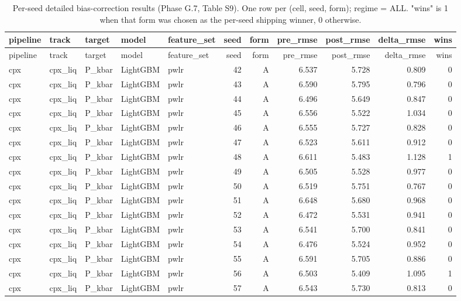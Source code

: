 \begin{longtable}{lllllrrrrrr}
\caption{Per-seed detailed bias-correction results (Phase G.7, Table S9). One row per (cell, seed, form); regime = ALL. "wins" is 1 when that form was chosen as the per-seed shipping winner, 0 otherwise.} \label{tab:bc_per_seed} \\
\toprule
pipeline & track & target & model & feature\_set & seed & form & pre\_rmse & post\_rmse & delta\_rmse & wins \\
\midrule
\endfirsthead
\toprule
pipeline & track & target & model & feature\_set & seed & form & pre\_rmse & post\_rmse & delta\_rmse & wins \\
\midrule
\endhead
\bottomrule
\endfoot
cpx & cpx\_liq & P\_kbar & LightGBM & pwlr & 42 & A & 6.537 & 5.728 & 0.809 & 0 \\
cpx & cpx\_liq & P\_kbar & LightGBM & pwlr & 43 & A & 6.590 & 5.795 & 0.796 & 0 \\
cpx & cpx\_liq & P\_kbar & LightGBM & pwlr & 44 & A & 6.496 & 5.649 & 0.847 & 0 \\
cpx & cpx\_liq & P\_kbar & LightGBM & pwlr & 45 & A & 6.556 & 5.522 & 1.034 & 0 \\
cpx & cpx\_liq & P\_kbar & LightGBM & pwlr & 46 & A & 6.555 & 5.727 & 0.828 & 0 \\
cpx & cpx\_liq & P\_kbar & LightGBM & pwlr & 47 & A & 6.523 & 5.611 & 0.912 & 0 \\
cpx & cpx\_liq & P\_kbar & LightGBM & pwlr & 48 & A & 6.611 & 5.483 & 1.128 & 1 \\
cpx & cpx\_liq & P\_kbar & LightGBM & pwlr & 49 & A & 6.505 & 5.528 & 0.977 & 0 \\
cpx & cpx\_liq & P\_kbar & LightGBM & pwlr & 50 & A & 6.519 & 5.751 & 0.767 & 0 \\
cpx & cpx\_liq & P\_kbar & LightGBM & pwlr & 51 & A & 6.648 & 5.680 & 0.968 & 0 \\
cpx & cpx\_liq & P\_kbar & LightGBM & pwlr & 52 & A & 6.472 & 5.531 & 0.941 & 0 \\
cpx & cpx\_liq & P\_kbar & LightGBM & pwlr & 53 & A & 6.541 & 5.700 & 0.841 & 0 \\
cpx & cpx\_liq & P\_kbar & LightGBM & pwlr & 54 & A & 6.476 & 5.524 & 0.952 & 0 \\
cpx & cpx\_liq & P\_kbar & LightGBM & pwlr & 55 & A & 6.591 & 5.705 & 0.886 & 0 \\
cpx & cpx\_liq & P\_kbar & LightGBM & pwlr & 56 & A & 6.503 & 5.409 & 1.095 & 1 \\
cpx & cpx\_liq & P\_kbar & LightGBM & pwlr & 57 & A & 6.543 & 5.730 & 0.813 & 0 \\

\end{longtable}

